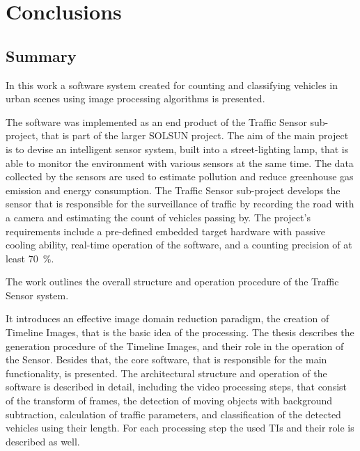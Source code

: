 \renewcommand{\thechapter}{\Alph{chapter}}
\setcounter{chapter}{3}  %
\chapter*{Conclusions}\label{chap:Conclusions}
\setcounter{equation}{0} 
\setcounter{section}{0}
\section{Summary}
In this work a software system created for counting and classifying vehicles in urban scenes using image processing algorithms is presented.

The software was implemented as an end product of the Traffic Sensor sub-project, that is part of the larger SOLSUN project.
The aim of the main project is to devise an intelligent sensor system, built into a street-lighting lamp, that is able to monitor the environment with various sensors at the same time.
The data collected by the sensors are used to estimate pollution and reduce greenhouse gas emission and energy consumption. 
The Traffic Sensor sub-project develops the sensor that is responsible for the surveillance of traffic by recording the road with a camera and estimating the count of vehicles passing by.
The project's requirements include a pre-defined embedded target hardware with passive cooling ability, real-time operation of the software, and a counting precision of at least \SI{70}{\%}.

The work outlines the overall structure and operation procedure of the Traffic Sensor system. 

It introduces an effective image domain reduction paradigm, the creation of Timeline Images, that is the basic idea of the processing.
The thesis describes the generation procedure of the Timeline Images, and their role in the operation of the Sensor.
Besides that, the core software, that is responsible for the main functionality, is presented.
The architectural structure and operation of the software is described in detail, including the video processing steps, that consist of the transform of frames, the detection of moving objects with background subtraction, calculation of traffic parameters, and classification of the detected vehicles using their length.
For each processing step the used TIs and their role is described as well.

